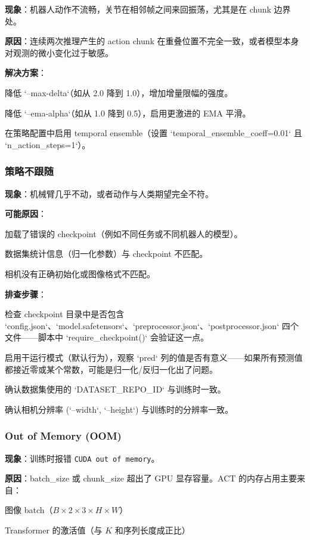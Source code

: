 \documentclass[UTF8,a4paper,11pt]{ctexart}
\begin{document}
{\textbf{现象}：机器人动作不流畅，关节在相邻帧之间来回振荡，尤其是在 chunk 边界处。

\textbf{原因}：连续两次推理产生的 action chunk 在重叠位置不完全一致，或者模型本身对观测的微小变化过于敏感。

\textbf{解决方案}：
\item[1] 降低 `--max-delta`（如从 2.0 降到 1.0），增加增量限幅的强度。
\item[2] 降低 `--ema-alpha`（如从 1.0 降到 0.5），启用更激进的 EMA 平滑。
\item[3] 在策略配置中启用 temporal ensemble（设置 `temporal_ensemble_coeff=0.01` 且 `n_action_steps=1`）。

\subsubsection{策略不跟随}

\textbf{现象}：机械臂几乎不动，或者动作与人类期望完全不符。

\textbf{可能原因}：
\item[1] 加载了错误的 checkpoint（例如不同任务或不同机器人的模型）。
\item[2] 数据集统计信息（归一化参数）与 checkpoint 不匹配。
\item[3] 相机没有正确初始化或图像格式不匹配。

\textbf{排查步骤}：
\item[1] 检查 checkpoint 目录中是否包含 `config.json`、`model.safetensors`、`preprocessor.json`、`postprocessor.json` 四个文件——脚本中 `require_checkpoint()` 会验证这一点。
\item[2] 启用干运行模式（默认行为），观察 `pred` 列的值是否有意义——如果所有预测值都接近零或某个常数，可能是归一化/反归一化出了问题。
\item[3] 确认数据集使用的 `DATASET_REPO_ID` 与训练时一致。
\item[4] 确认相机分辨率 (`--width`, `--height`) 与训练时的分辨率一致。

\subsubsection{Out of Memory (OOM)}

\textbf{现象}：训练时报错 \texttt{CUDA out of memory}。

\textbf{原因}：batch_size 或 chunk_size 超出了 GPU 显存容量。ACT 的内存占用主要来自：
\item 图像 batch（$B \times 2 \times 3 \times H \times W$）
\item Transformer 的激活值（与 $K$ 和序列长度成正比）

}
\end{document}
